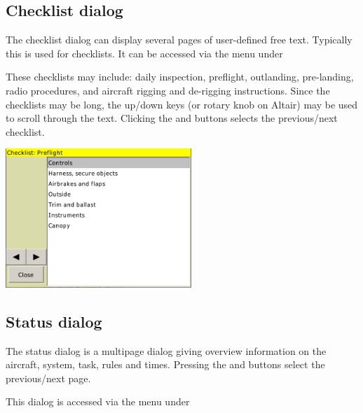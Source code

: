 \documentclass[a4paper,12pt]{refrep}
\begin{document}
\subsection*{Checklist dialog}
The checklist dialog can display several pages of user-defined free text.
Typically this is used for checklists. It can be accessed via the menu under 
\begin{quote}
\blink{}
\end{quote}

These checklists may include: daily inspection, preflight, outlanding,
pre-landing, radio procedures, and aircraft rigging and de-rigging
instructions.  Since the checklists may be long, the up/down keys (or rotary
knob on Altair) may be used to scroll through the text. Clicking the
\button{$<$} and \button{$>$} buttons selects the previous/next checklist.

\begin{center}
\includegraphics[angle=0,width=7cm,keepaspectratio='true']{figures/checklist.png}
\end{center}

\subsection*{Status dialog}
The status dialog is a multipage dialog giving overview information on the 
aircraft, system, task, rules and times. Pressing the \button{$<$} and
\button{$>$} buttons select the previous/next page.

This dialog is accessed via the menu under 
\begin{quote}
\blink{}
\end{quote}
\end{document}
